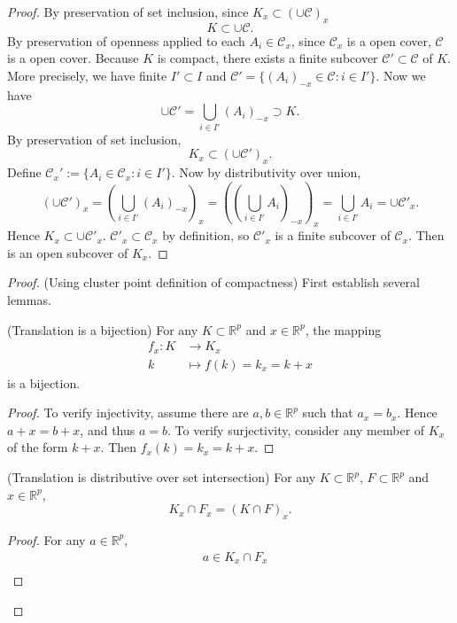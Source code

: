 \begin{enumerate}
\begin{proof}
	By preservation of set inclusion, since $K_x \subset  (\cup \mathcal{C})_x $
	\[
		K \subset   \cup \mathcal{C}
	.\] 
	By preservation of openness applied to each $A_i \in \mathcal{C}_x$, since $\mathcal{C}_x $ is a open cover, $\mathcal{C}$ is a open cover. Because $K$ is compact, there exists a finite subcover $\mathcal{C}' \subset \mathcal{C}$ of $K$. More precisely, we have finite $I' \subset I$ and $\mathcal{C}' = \{(A_i)_{-x} \in \mathcal{C}: i \in I'\} $. Now we have \[
		\cup \mathcal{C}'  = \bigcup_{i \in  I'} \left( A_i \right) _{-x}\supset K
	.\] 
	By preservation of set inclusion,
	\[
		K_x \subset (\cup \mathcal{C}')_{x}
	.\]
	Define $\mathcal{C}_x' := \{A_i \in \mathcal{C}_x: i \in I'\} $. Now by distributivity over union, \[
		(\cup \mathcal{C}')_{x} = 
		\left(  \bigcup_{i \in  I'} \left(A_i \right) _{-x} \right) _{x} = 
		\left( \left( \bigcup_{i \in  I'} A_i \right) _{-x} \right) _{x} = 
		\bigcup_{i \in  I'} A_i  =
		\cup \mathcal{C}'_{x}
	.\] 
	Hence $K_x \subset \cup \mathcal{C}'_{x}$. $\mathcal{C}'_x \subset \mathcal{C}_x$ by definition, so $\mathcal{C}'_{x}$ is a finite subcover of $\mathcal{C}_x$. 
	Then  is an open subcover of $K_x$.
\end{proof}
\newpage
\begin{proof}(Using cluster point definition of compactness)
	First establish several lemmas.
	\begin{lemma}(Translation is a bijection)
		For any $K \subset \mathbb{R}^p$ and $x \in \mathbb{R}^p$, the mapping \begin{align*}
			f_x: K &\longrightarrow K_x \\
			k &\longmapsto f(k) = k_x = k + x
		\end{align*}
		is a bijection.
	\begin{proof}
		To verify injectivity, assume there are  $a, b \in \mathbb{R}^p$ such that $a_x = b_x$. Hence $a + x = b + x$, and thus $a = b$.
		To verify surjectivity, consider any member of $K_x$ of the form $k + x$. Then $f_x(k) = k_x = k+x$.
	\end{proof}
	\end{lemma}
	\begin{lemma}(Translation is distributive over set intersection)
		For any $K \subset \mathbb{R}^p$, $F\subset \mathbb{R}^p$ and $x \in \mathbb{R}^p$,\[
			K_x \cap F_x = (K \cap F)_x
		.\] 
	\begin{proof}
		For any $a \in \mathbb{R}^p$,
		\begin{align*}
			&a \in K_x \cap F_x \\

\end{align*}
\end{proof}
\end{lemma}
\end{proof}
\end{enumerate}
